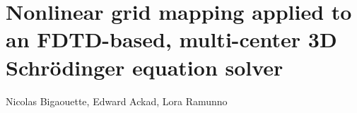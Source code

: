 
\newcommand{\PaperTitleMapping}{Nonlinear grid mapping applied to an FDTD-based, multi-center 3D
                                  Schr\"odinger equation solver}

\section{\PaperTitleMapping}

\begin{flushright}
Nicolas Bigaouette, Edward Ackad, Lora Ramunno
\end{flushright}



